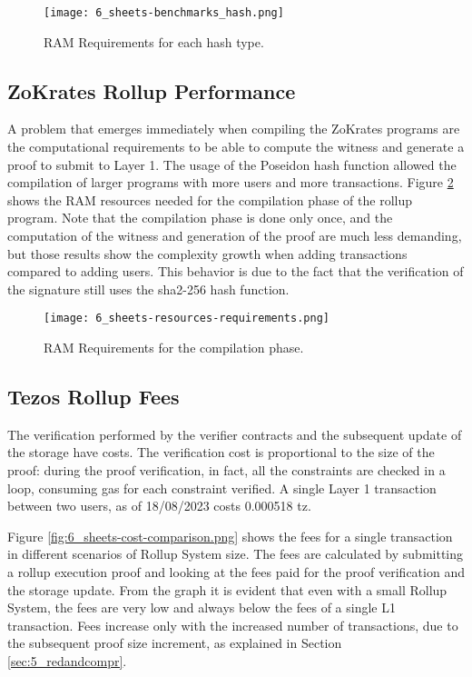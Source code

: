 \begin{figure}[ht]
	\centering
	\texttt{[image: 6\_sheets-benchmarks\_hash.png]}
	\caption[RAM Usage hash]{RAM Requirements for each hash type.}  
	\label{fig:6_sheets-benchmarks_hash.png}
  \end{figure} 

\subsection{ZoKrates Rollup Performance\label{subsec:6_zokratesperf}}

A problem that emerges immediately when compiling the ZoKrates programs are the computational requirements to be able to compute the witness and generate a proof to submit to Layer 1. The usage of the Poseidon hash function allowed the compilation of larger programs with more users and more transactions. Figure \ref{fig:6_sheets-resources-requirements.png} shows the RAM resources needed for the compilation phase of the rollup program. Note that the compilation phase is done only once, and the computation of the witness and generation of the proof are much less demanding, but those results show the complexity growth when adding transactions compared to adding users. This behavior is due to the fact that the verification of the signature still uses the sha2-256 hash function.

\begin{figure}[ht]
	\centering
	\texttt{[image: 6\_sheets-resources-requirements.png]}
	\caption[RAM Requirements]{RAM Requirements for the compilation phase.}  
	\label{fig:6_sheets-resources-requirements.png}
  \end{figure} 

\subsection{Tezos Rollup Fees}

The verification performed by the verifier contracts and the subsequent update of the storage have costs. The verification cost is proportional to the size of the proof: during the proof verification, in fact, all the constraints are checked in a loop, consuming gas for each constraint verified. A single Layer 1 transaction between two users, as of 18/08/2023 costs 0.000518 tz.

Figure \ref{fig:6_sheets-cost-comparison.png} shows the fees for a single transaction in different scenarios of Rollup System size. The fees are calculated by submitting a rollup execution proof and looking at the fees paid for the proof verification and the storage update. From the graph it is evident that even with a small Rollup System, the fees are very low and always below the fees of a single L1 transaction. Fees increase only with the increased number of transactions, due to the subsequent proof size increment, as explained in Section \ref{sec:5_redandcompr}.

